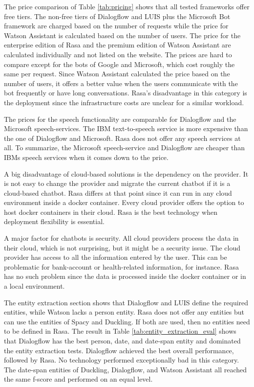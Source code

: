 The price comparison of Table \ref{tab:pricing} shows that all 
tested frameworks offer free tiers.
The non-free tiers of Dialogflow and LUIS plus the Microsoft Bot framework are charged based on the number of requests while the price for Watson Assistant is calculated based on the number of users.
The price for the enterprise edition of Rasa and the premium edition of Watson Assistant are calculated individually and not listed on the website.
The prices are hard to compare except for the bots of Google and Microsoft, which cost roughly the same per request. 
Since Watson Assistant calculated the price based on the number of users, it offers a better value when the users communicate with the bot frequently or have long conversations.
Rasa's disadvantage in this category is the deployment since the infrastructure costs are unclear for a similar workload.

The prices for the speech functionality are comparable for Dialogflow and the Microsoft speech-services.
The IBM text-to-speech service is more expensive than the one of Dialogflow and Microsoft.
Rasa does not offer any speech services at all.
To summarize, the Microsoft speech-service and Dialogflow are cheaper than IBMs speech services when it comes down to the price. 

A big disadvantage of cloud-based solutions is the dependency on the provider.
It is not easy to change the provider and migrate the current chatbot if it is a cloud-based chatbot. 
Rasa differs at that point since it can run in any cloud environment inside a docker container.
Every cloud provider offers the option to host docker containers in their cloud.
Rasa is the best technology when deployment flexibility is essential.

A major factor for chatbots is security.
All cloud providers process the data in their cloud, which is not surprising, but it might be a security issue.
The cloud provider has access to all the information entered by the user.
This can be problematic for bank-account or health-related information, for instance.
Rasa has no such problem since the data is processed inside the docker container or in a local environment.

The entity extraction section shows that Dialogflow and LUIS 
define the required entities, while Watson lacks a person entity.
Rasa does not offer any entities but can use the entities of 
Spacy and Duckling.
If both are used, then no entities need to be defined in Rasa.
The result in Table \ref{tab:entity_extraction_eval} shows that 
Dialogflow has the best person, date, and date-span entity and dominated the entity extraction tests.
Dialogflow achieved the best overall performance, followed by Rasa.
No technology performed exceptionally bad in this category. 
The date-span entities of Duckling, Dialogflow, and Watson Assistant all reached the same f-score and performed on an equal level.

